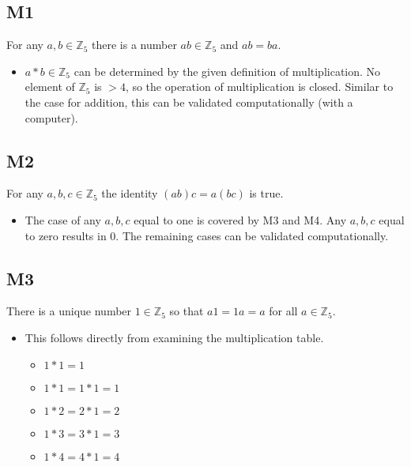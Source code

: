 \documentclass{article}
\begin{document}
\subsection{M1}

For any $a, b\in\mathbb{Z}_5$ there is a number $ab\in\mathbb{Z}_5$ and $ab=ba$.

\begin{itemize}
    \item $a*b\in\mathbb{Z}_5$ can be determined by the given definition of multiplication.  No element of $\mathbb{Z}_5$ is $>4$, so the operation of multiplication is closed.  Similar to the case for addition, this can be validated computationally (with a computer).
\end{itemize}

\subsection{M2}

For any $a, b, c\in\mathbb{Z}_5$ the identity $(ab)c=a(bc)$ is true.

\begin{itemize}
	\item The case of any $a, b, c$ equal to one is covered by M3 and M4.  Any $a, b, c$ equal to zero results in 0.  The remaining cases can be validated computationally.
\end{itemize}

\subsection{M3}

There is a unique number $1\in\mathbb{Z}_5$ so that $a1=1a=a$ for all $a\in\mathbb{Z}_5$.

\begin{itemize}
    \item This follows directly from examining the multiplication table.
    \begin{itemize}
        \item[\ding{217}] $1*1=1$
        \item[\ding{217}] $1*1=1*1=1$
        \item[\ding{217}] $1*2=2*1=2$
        \item[\ding{217}] $1*3=3*1=3$
        \item[\ding{217}] $1*4=4*1=4$
    \end{itemize}
\end{itemize}
\end{document}

